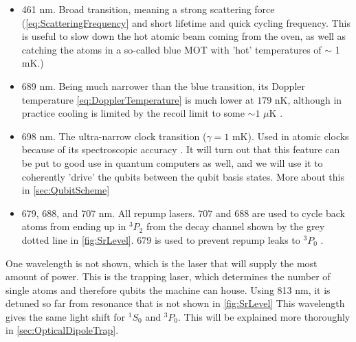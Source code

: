 \begin{itemize}
	\item 461 nm. Broad transition, meaning a strong scattering force (\cref{eq:ScatteringFrequency} and short lifetime and quick cycling frequency. This is useful to slow down the hot atomic beam coming from the oven, as well as catching the atoms in a so-called blue \ac{MOT} with 'hot' temperatures of $\sim$ 1 mK.)
	
	\item 689 nm. Being much narrower than the blue transition, its Doppler temperature \cref{eq:DopplerTemperature} is much lower at $179$ nK, although in practice cooling is limited by the recoil limit to some $\sim 1$ $\mu$K \cite{Boyd2007,Stellmer2013}.
	
	\item 698 nm. The ultra-narrow clock transition ($\gamma = 1$ mK). Used in atomic clocks because of its spectroscopic accuracy \cite{Bloom2014}. It will turn out that this feature can be put to good use in quantum computers as well, and we will use it to coherently 'drive' the qubits between the qubit basis states. More about this in \cref{sec:QubitScheme}
	
	\item 679, 688, and 707 nm. All repump lasers. 707 and 688 are used to cycle back atoms from ending up in ${}^3P_2$ from the decay channel shown by the grey dotted line in \cref{fig:SrLevel}. 679 is used to prevent repump leaks to ${}^3P_0$ \cite{Stellmer2013,Xu2003}.
\end{itemize}

One wavelength is not shown, which is the laser that will supply the most amount of power. This is the trapping laser, which determines the number of single atoms and therefore qubits the machine can house. Using 813 nm, it is detuned so far from resonance that is not shown in \cref{fig:SrLevel} This wavelength gives the same light shift for ${}^1S_0$ and ${}^3 P_0$. This will be explained more thoroughly in \cref{sec:OpticalDipoleTrap}. 

